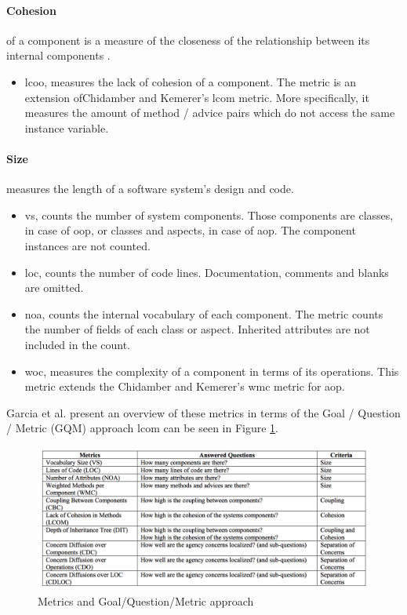 \paragraph{Cohesion}of a component is a measure of the closeness of the relationship between its internal components \cite{sommerville2004software}.
	\begin{itemize}
		\item \ac{lcoo}, measures the lack of cohesion of a component.
		The metric is an extension ofChidamber and Kemerer's \cite{chidamber1994metrics} \ac{lcom} metric.
		More specifically, it measures the amount of method / advice pairs which do not access the same instance variable.
	\end{itemize}

\paragraph{Size}measures the length of a software system's design and code.
	\begin{itemize}
		\item \ac{vs}, counts the number of system components.
		Those components are classes, in case of \ac{oop}, or classes and aspects, in case of \ac{aop}.
		The component instances are not counted.

		\item \ac{loc}, counts the number of code lines.
		Documentation, comments and blanks are omitted.

		\item \ac{noa}, counts the internal vocabulary of each component.
		The metric counts the number of fields of each class or aspect.
		Inherited attributes are not included in the count.

		\item \ac{woc}, measures the complexity of a component in terms of its operations.
		This metric extends the Chidamber and Kemerer's \cite{chidamber1994metrics} \ac{wmc} metric for \ac{aop}.
	\end{itemize}

Garcia et al. \cite{garcia2003agents} present an overview of these metrics in terms of the Goal / Question / Metric (GQM) approach \cite{wohlin2012experimentation} \ac{lcom} can be seen in Figure \ref{fig:metrics_questions}.

\begin{figure}[H]
	\centering
  	\includegraphics[width=.9\textwidth]{figures/metrics_questions.png}
  	\caption{Metrics and Goal/Question/Metric approach \cite{garcia2003agents}}
  	\label{fig:metrics_questions}
\end{figure}

